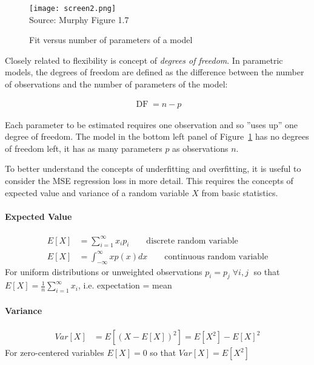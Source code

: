 \begin{figure}
\centering
\texttt{[image: screen2.png]} \\

\scriptsize Source: Murphy Figure 1.7
\caption{Fit versus number of parameters of a model}
\label{fig:polynomial_chap11}
\end{figure}

Closely related to flexibility is concept of \emph{degrees of freedom}. In parametric models, the degrees of freedom are defined as the difference between the number of observations and the number of parameters of the model:

\begin{align*}
\operatorname{DF} = n - p
\end{align*}

\noindent Each parameter to be estimated requires one observation and so ''uses up'' one degree of freedom. The model in the bottom left panel of Figure~\ref{fig:polynomial_chap11} has no degrees of freedom left, it has as many parameters $p$ as observations $n$. 

To better understand the concepts of underfitting and overfitting, it is useful to consider the MSE regression loss in more detail. This requires the concepts of expected value and variance of a random variable $X$ from basic statistics.

\begin{tcolorbox}[colback=alert]
\paragraph*{Expected Value} 
\begin{align*}
E[X] &= \sum_{i=1}^{\infty} x_i p_i \qquad \text{discrete random variable}\\
E[X] &= \int_{-\infty}^{\infty} x p(x) dx \qquad \text{continuous random variable}
\end{align*}
For uniform distributions or unweighted observations $p_i=p_j \; \forall i, j \; $ so that $E[X] = \frac{1}{n} \sum_{i=1}^{\infty} x_i $, i.e. expectation = mean
\end{tcolorbox}

\begin{tcolorbox}[colback=alert]
\paragraph*{Variance} 
\begin{align*}
Var[X] &= E[(X - E[X])^2] = E[X^2] - E[X]^2 
\end{align*}
For zero-centered variables $E[X] = 0$ so that $Var[X] = E[X^2]$
\end{tcolorbox}

